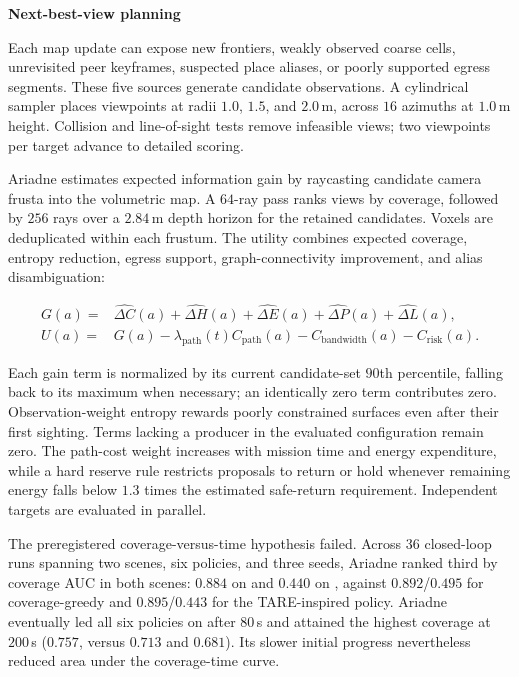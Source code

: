 \documentclass[10pt,a4paper]{article}
\newcommand{\code}[1]{\texttt{\small\detokenize{#1}}}
\newcommand{\indentedheading}[1]{\par\addvspace{0.65em}\noindent\hspace*{1em}\textbf{#1}\par\smallskip}
\begin{document}
\indentedheading{Next-best-view planning}

Each map update can expose new frontiers, weakly observed coarse cells,
unrevisited peer keyframes, suspected place aliases, or poorly supported
egress segments. These five sources generate candidate observations.
A cylindrical sampler places viewpoints at radii $1.0$, $1.5$, and
$2.0$\,m, across $16$ azimuths at $1.0$\,m height. Collision and
line-of-sight tests remove infeasible views; two viewpoints per target
advance to detailed scoring.

Ariadne estimates expected information gain by raycasting candidate
camera frusta into the volumetric map. A $64$-ray pass ranks views by
coverage, followed by $256$ rays over a $2.84$\,m depth horizon for the
retained candidates. Voxels are deduplicated within each frustum.
The utility combines expected coverage, entropy reduction, egress
support, graph-connectivity improvement, and alias disambiguation:

\begin{align}
G(a) ={}&
    \widehat{\Delta C}(a)
  + \widehat{\Delta H}(a)
  + \widehat{\Delta E}(a)
  + \widehat{\Delta P}(a)
  + \widehat{\Delta L}(a),
    \label{eq:nbv-gain}\\
U(a) ={}&
    G(a)
  - \lambda_{\mathrm{path}}(t)C_{\mathrm{path}}(a)
  - C_{\mathrm{bandwidth}}(a)
  - C_{\mathrm{risk}}(a).
    \label{eq:nbv-utility}
\end{align}

Each gain term is normalized by its current candidate-set $90$th
percentile, falling back to its maximum when necessary; an identically
zero term contributes zero. Observation-weight entropy rewards poorly
constrained surfaces even after their first sighting. Terms lacking
a producer in the evaluated configuration remain zero. The path-cost
weight increases with mission time and energy expenditure, while a
hard reserve rule restricts proposals to return or hold whenever
remaining energy falls below $1.3$ times the estimated safe-return
requirement. Independent targets are evaluated in parallel.

The preregistered coverage-versus-time hypothesis failed. Across
$36$ closed-loop runs spanning two scenes, six policies, and three seeds,
Ariadne ranked third by coverage AUC in both scenes: $0.884$ on
\code{ci\_tiny} and $0.440$ on \code{maze\_short}, against
$0.892$/$0.495$ for coverage-greedy and $0.895$/$0.443$ for the
TARE-inspired policy. Ariadne eventually led all six policies on
\code{ci\_tiny} after $80$\,s and attained the highest
\code{maze\_short} coverage at $200$\,s ($0.757$, versus $0.713$
and $0.681$). Its slower initial progress nevertheless reduced
area under the coverage-time curve.
\end{document}
